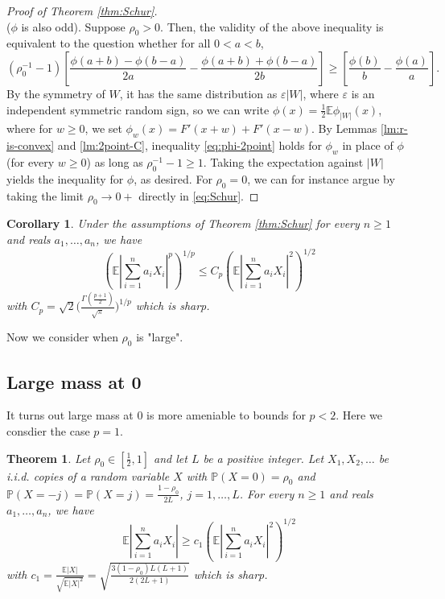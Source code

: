 \documentclass[10pt]{article}
\newcommand{\E}{\mathbb{E}}
\newcommand{\1}{\textbf{1}}
\newcommand{\p}[1]{\mathbb{P}\left( #1 \right)}
\newtheorem{theorem}{Theorem}[subsection]
\newtheorem{corollary}{Corollary}[subsection]
\theoremstyle{remark}
\theoremstyle{definition}
\begin{document}
\begin{proof}[Proof of Theorem \ref{thm:Schur}]
\[\]
($\phi$ is also odd). Suppose $\rho_0 > 0$. Then, the validity of the above inequality is equivalent to the question whether for all $0 < a < b$,
\begin{equation}\label{eq:phi-2point}
(\rho_0^{-1}-1)\left[\frac{\phi(a+b)-\phi(b-a)}{2a} - \frac{\phi(a+b)+\phi(b-a)}{2b}\right] \geq \left[ \frac{\phi(b)}{b}-\frac{\phi(a)}{a}\right].
\end{equation}
By the symmetry of $W$, it has the same distribution as $\varepsilon |W|$, where $\varepsilon$ is an independent symmetric random sign, so we can write $\phi(x) = \frac{1}{2}\E\phi_{|W|}(x)$, where for $w \geq 0$, we set $\phi_w(x) = F'(x+w) + F'(x-w)$. By Lemmas \ref{lm:r-is-convex} and \ref{lm:2point-C}, inequality \eqref{eq:phi-2point} holds for $\phi_w$ in place of $\phi$ (for every $w \geq 0$) as long as $\rho_0^{-1} - 1 \geq 1$. Taking the expectation against $|W|$ yields the inequality for $\phi$, as desired. For $\rho_0 =0$, we can for instance argue by taking the limit $\rho_0 \to 0+$ directly in \eqref{eq:Schur}.
\end{proof}

\begin{corollary}
Under the assumptions of Theorem \ref{thm:Schur} for every $n \geq 1$ and reals $a_1,\ldots,a_n$, we have
\begin{equation}\label{eq:2-p>3'}
\left(\E\left|\sum_{i=1}^n a_iX_i \right|^p\right)^{1/p} \leq C_p \left(\E\left|\sum_{i=1}^n a_iX_i \right|^2\right)^{1/2} 
\end{equation}
with $C_p = \sqrt{2} \Big(\frac{\Gamma (\frac{p+1}{2})}{\sqrt{\pi}} \Big)^{1/p}$ which is sharp.
\end{corollary}

Now we consider when $\rho_0$ is "large".

\subsection{Large mass at 0}

It turns out large mass at 0 is more ameniable to bounds for $p < 2$. Here we consdier the case $p=1$. 

\begin{theorem}\label{thm:L1-L2}
Let $\rho_0 \in [\frac{1}{2},1]$ and let $L$ be a positive integer. Let $X_1,X_2,\ldots$ be i.i.d. copies of a random variable $X$ with $\p{X = 0} = \rho_0$ and $\p{X = -j} = \p{X = j} = \frac{1-\rho_0}{2L}$, $j = 1, \ldots, L$. For every $n \geq 1$ and reals $a_1,\ldots,a_n$, we have
\begin{equation}\label{eq:L1-L2}
\E\left|\sum_{i=1}^n a_iX_i \right| \geq c_1\left(\E\left|\sum_{i=1}^n a_iX_i \right|^2\right)^{1/2} 
\end{equation}
with $c_1 = \frac{\E|X|}{\sqrt{\E|X|^2}} = \sqrt{\frac{3(1-\rho_0)L(L+1)}{2(2L+1)}}$ which is sharp.
\end{theorem}
\end{document}
